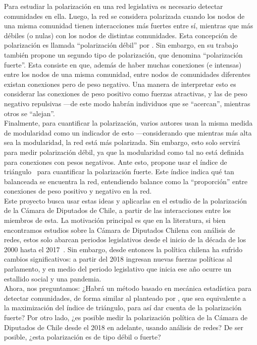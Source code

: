 \documentclass[hyperref]{proyectotesis}
\begin{document}
Para estudiar la polarización en una red legislativa es necesario detectar comunidades en ella. Luego, la red se considera polarizada cuando los nodos de una misma comunidad tienen interacciones más fuertes entre sí, mientras que más débiles (o nulas) con los nodos de distintas comunidades. Esta concepción de polarización es llamada ``polarización débil'' por \citet{neal_sign_2020}. Sin embargo, en su trabajo también propone un segundo tipo de polarización, que denomina ``polarización fuerte''. Esta consiste en que, además de haber muchas conexiones (e intensas) entre los nodos de una misma comunidad, entre nodos de comunidades diferentes existan conexiones pero de peso negativo. Una manera de interpretar esto es considerar las conexiones de peso positivo como fuerzas atractivas, y las de peso negativo repulsivas ---de este modo habrán individuos que se ``acercan'', mientras otros se ``alejan''.\\

Finalmente, para cuantificar la polarización, varios autores usan la misma medida de modularidad como un indicador de esto ---considerando que mientras más alta sea la modularidad, la red está más polarizada. Sin embargo, esto solo servirá para medir polarización débil, ya que la modularidad como tal no está definida para conexiones con pesos negativos. Ante esto, \citet{neal_sign_2020} propone usar el índice de triángulo~\cite{aref_measuring_2018} para cuantificar la polarización fuerte. Este índice indica qué tan balanceada se encuentra la red, entendiendo balance como la ``proporción'' entre conexiones de peso positivo y negativo en la red.\\

Este proyecto busca usar estas ideas y aplicarlas en el estudio de la polarización de la Cámara de Diputados de Chile, a partir de las interacciones entre los miembros de esta. La motivación principal es que en la literatura, si bien encontramos estudios sobre la Cámara de Diputados Chilena con análisis de redes, estos solo abarcan periodos legislativos desde el inicio de la década de los 2000 hasta el 2017~\cite{aleman_explaining_2013, le_foulon_moran_cooperation_2020}. Sin embargo, desde entonces la política chilena ha sufrido cambios significativos: a partir del 2018 ingresan nuevas fuerzas políticas al parlamento, y en medio del periodo legislativo que inicia ese año ocurre un estallido social y una pandemia.\\

Ahora, nos preguntamos: ¿Habrá un método basado en mecánica estadística para detectar comunidades, de forma similar al planteado por \citet{reichardt_statistical_2006},  que sea equivalente a la maximización del índice de triángulo, para así dar cuenta de la polarización fuerte? Por otro lado, ¿es posible medir la polarización política de la Cámara de Diputados de Chile desde el 2018 en adelante, usando análisis de redes? De ser posible, ¿esta polarización es de tipo débil o fuerte?
\end{document}
